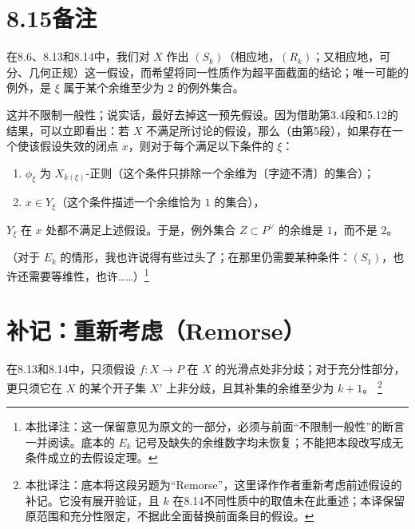 \documentclass[openany]{ctexbook}
\newcommand{\note}[1]{\footnote{本批译注：#1}}
\begin{document}
\section*{8.15\quad 备注}
在8.6、8.13和8.14中，我们对 $X$ 作出 $(S_k)$（相应地，$(R_k)$；又相应地，可分、几何正规）这一假设，而希望将同一性质作为超平面截面的结论；唯一可能的例外，是 $\xi$ 属于某个余维至少为 $2$ 的例外集合。

这并不限制一般性；说实话，最好去掉这一预先假设。因为借助第3.4段和5.12的结果，可以立即看出：若 $X$ 不满足所讨论的假设，那么（由第5段），如果存在一个使该假设失效的闭点 $x$，则对于每个满足以下条件的 $\xi$：
\begin{enumerate}
\item $\phi_\xi$ 为 $X_{k(\xi)}$-正则（这个条件只排除一个余维为〔字迹不清〕的集合）；
\item $x\in Y_\xi$（这个条件描述一个余维恰为 $1$ 的集合），
\end{enumerate}
$Y_\xi$ 在 $x$ 处都不满足上述假设。于是，例外集合 $Z\subset P^\vee$ 的余维是 $1$，而不是 $2$。

（对于 $E_k$ 的情形，我也许说得有些过头了；在那里仍需要某种条件：$(S_1)$，也许还需要等维性，也许……）\note{这一保留意见为原文的一部分，必须与前面“不限制一般性”的断言一并阅读。底本的 $E_k$ 记号及缺失的余维数字均未恢复；不能把本段改写成无条件成立的去假设定理。}
\section*{补记：重新考虑（Remorse）}
在8.13和8.14中，只须假设 $f\colon X\to P$ 在 $X$ 的光滑点处非分歧；对于充分性部分，更只须它在 $X$ 的某个开子集 $X'$ 上非分歧，且其补集的余维至少为 $k+1$。
\note{底本将这段另题为“Remorse”，这里译作作者重新考虑前述假设的补记。它没有展开验证，且 $k$ 在8.14不同性质中的取值未在此重述；本译保留原范围和充分性限定，不据此全面替换前面条目的假设。}
\end{document}
